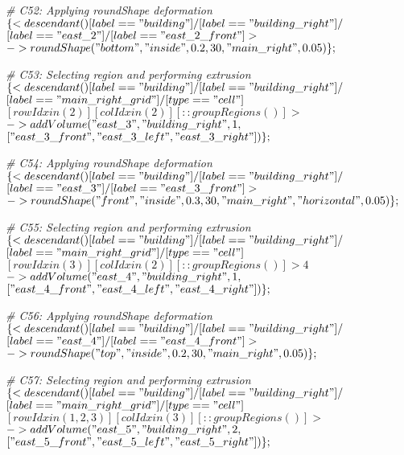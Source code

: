 \noindent \textit{\# C52: Applying roundShape deformation}\\
$\{< descendant() [label=="building"] / [label=="building\_right"] / $\\
$[label=="east\_2"] / [label=="east\_2\_front"] > $\\
$-> roundShape("bottom", "inside", 0.2, 30, "main\_right", 0.05)\};$

\noindent \textit{\# C53: Selecting region and performing extrusion}\\
$\{< descendant() [label=="building"] / [label=="building\_right"] / $\\
$[label=="main\_right\_grid"] / [type=="cell"] $\\
$[rowIdx in (2)] [colIdx in (2)] [::groupRegions()] > $\\
$-> addVolume("east\_3", "building\_right", 1, $\\
$["east\_3\_front", "east\_3\_left", "east\_3\_right"])\};$

\noindent \textit{\# C54: Applying roundShape deformation}\\
$\{< descendant() [label=="building"] / [label=="building\_right"] / $\\
$[label=="east\_3"] / [label=="east\_3\_front"] > $\\
$-> roundShape("front", "inside", 0.3, 30, "main\_right", "horizontal", 0.05)\};$

\noindent \textit{\# C55: Selecting region and performing extrusion}\\
$\{< descendant() [label=="building"] / [label=="building\_right"] / $\\
$[label=="main\_right\_grid"] / [type=="cell"] $\\
$[rowIdx in (3)] [colIdx in (2)] [::groupRegions()] > 4$\\
$-> addVolume("east\_4", "building\_right", 1, $\\
$["east\_4\_front", "east\_4\_left", "east\_4\_right"])\};$

\noindent \textit{\# C56: Applying roundShape deformation}\\
$\{< descendant() [label=="building"] / [label=="building\_right"] / $\\
$[label=="east\_4"] / [label=="east\_4\_front"] > $\\
$-> roundShape("top", "inside", 0.2, 30, "main\_right", 0.05)\};$

\noindent \textit{\# C57: Selecting region and performing extrusion}\\
$\{< descendant() [label=="building"] / [label=="building\_right"] / $\\
$[label=="main\_right\_grid"] / [type=="cell"] $\\
$[rowIdx in (1, 2, 3)] [colIdx in (3)] [::groupRegions()] > $\\
$-> addVolume("east\_5", "building\_right", 2, $\\
$["east\_5\_front", "east\_5\_left", "east\_5\_right"])\};$

